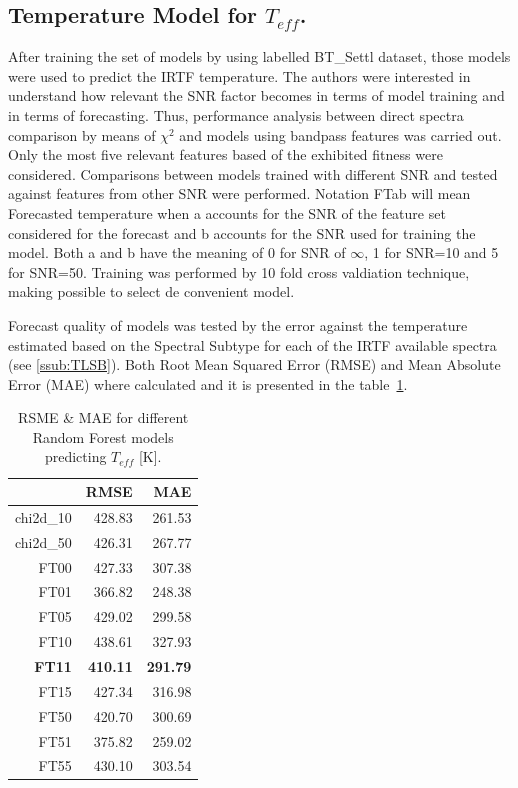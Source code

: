 \subsection{Temperature Model for $T_{eff}$.}
\label {ssub:teff_model}
{
After training the set of models by using labelled BT\_Settl dataset, those models 
were used to predict the IRTF temperature.
The authors were interested in understand how relevant the SNR factor 
becomes in terms of model training and in terms of forecasting. Thus, 
performance analysis between direct spectra comparison by means of $ \chi^2 $ and 
models using bandpass features was carried out.
Only the most five relevant features based of the exhibited fitness were considered.
Comparisons between models trained with different SNR and tested against 
features from other SNR were performed. Notation FTab will mean Forecasted temperature
when a accounts for the SNR of the feature set considered for the forecast and b
accounts for the SNR used for training the model. Both a and b have the 
meaning of 0 for SNR of $\infty$, 1 for SNR=10 and 5 for SNR=50.
Training was performed by 10 fold cross valdiation technique, making possible 
to select de convenient model.

Forecast quality of models was tested by the error against the temperature 
estimated based on the Spectral Subtype for each of 
the IRTF available spectra (see \ref{ssub:TLSB}).
Both Root Mean Squared Error (RMSE) and Mean Absolute Error (MAE) where calculated 
and it is presented in the table~\ref{tab:model_Tvar}.

\begin{table}[ht]
\centering
\begin{tabular}{rrr}
  \hline
 & RMSE & MAE \\ 
  \hline
chi2d\_10 & 428.83 & 261.53 \\ 
  chi2d\_50 & 426.31 & 267.77 \\ 
  FT00 & 427.33 & 307.38 \\ 
  FT01 & 366.82 & 248.38 \\ 
  FT05 & 429.02 & 299.58 \\ 
  FT10 & 438.61 & 327.93 \\ 
  \textbf{FT11} & \textbf{410.11} & \textbf{291.79} \\ 
  FT15 & 427.34 & 316.98 \\ 
  FT50 & 420.70 & 300.69 \\ 
  FT51 & 375.82 & 259.02 \\ 
  FT55 & 430.10 & 303.54 \\ 
   \hline
\end{tabular}
\caption { RSME \& MAE for different Random Forest models predicting $T_{eff}$ [K].} 
\label{tab:model_Tvar} 
\end{table}

}
